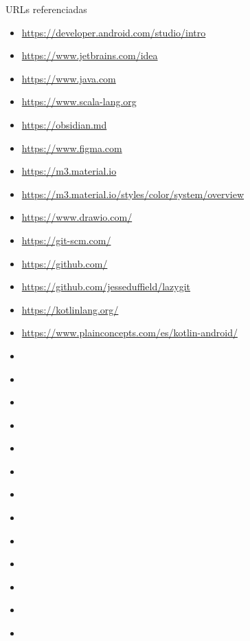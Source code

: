 %


URLs referenciadas
\begin{itemize}
  \item \url{https://developer.android.com/studio/intro}
  \item \url{https://www.jetbrains.com/idea}
  \item \url{https://www.java.com}
  \item \url{https://www.scala-lang.org}
  \item \url{https://obsidian.md}
  \item \url{https://www.figma.com}
  \item \url{https://m3.material.io}
  \item \url{https://m3.material.io/styles/color/system/overview}
  \item \url{https://www.drawio.com/}
  \item \url{https://git-scm.com/}
  \item \url{https://github.com/}
  \item \url{https://github.com/jesseduffield/lazygit}
  \item \url{https://kotlinlang.org/}
  \item \url{https://www.plainconcepts.com/es/kotlin-android/}
  \item \url{}
  \item \url{}
  \item \url{}
  \item \url{}
  \item \url{}
  \item \url{}
  \item \url{}
  \item \url{}
  \item \url{}
  \item \url{}
  \item \url{}
  \item \url{}
  \item \url{}
\end{itemize}

\makeBib


